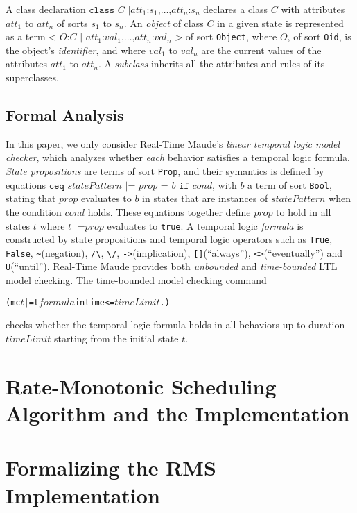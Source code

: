 \documentclass{llncs}
\begin{document}
A class declaration $\texttt{class }C\texttt{ |
}att_1\texttt{:}s_1\texttt{,}\ldots\texttt{,}att_n\texttt{:}s_n$
declares a class $C$ with attributes $att_1$ to $att_n$ of sorts $s_1$
to $s_n$. An \emph{object} of class $C$ in a given state is
represented as a term $\texttt{< } O\texttt{:} C \texttt{ | }
att_1\texttt{:}val_1\texttt{,} \ldots
\texttt{,}att_n\texttt{:}val_n\texttt{ >}$ of sort \verb|Object|,
where $O$, of sort \verb|Oid|, is the object's \emph{identifier}, and
where $val_1$ to $val_n$ are the current values of the attributes
$att_1$ to $att_n$. A \emph{subclass} inherits all the attributes and
rules of its superclasses.

\subsection{Formal Analysis}
In this paper, we only consider Real-Time Maude's \emph{linear
  temporal logic model checker}, which analyzes whether \emph{each}
behavior satisfies a temporal logic formula. \emph{State propositions}
are terms of sort \verb|Prop|, and their symantics is defined by
equations $\texttt{ceq } statePattern \texttt{ |= } prop \texttt{ = }
b \texttt{ if } cond$, with $b$ a term of sort \verb|Bool|, stating
that $prop$ evaluates to $b$ in states that are instances of
$statePattern$ when the condition $cond$ holds. These equations
together define $prop$ to hold in all states $t$ where $t \texttt{ |=
} prop$ evaluates to \verb|true|. A temporal logic \emph{formula} is
constructed by state propositions and temporal logic operators such as
\verb|True|, \verb|False|, \verb|~|(negation), \verb|/\|, \verb|\/|,
\verb|->|(implication), \verb|[]|(``always''),
\verb|<>|(``eventually'') and \verb|U|(``until''). Real-Time Maude
provides both \emph{unbounded} and \emph{time-bounded} LTL model
checking. The time-bounded model checking command
\begin{alltt}
  (mc \(t\) |=t \(formula\) in time <= \(timeLimit\) .)
\end{alltt}
checks whether the temporal logic formula holds in all behaviors up to
duration $timeLimit$ starting from the initial state $t$.

\section{Rate-Monotonic Scheduling Algorithm and the Implementation}

\section{Formalizing the RMS Implementation}
\end{document}
